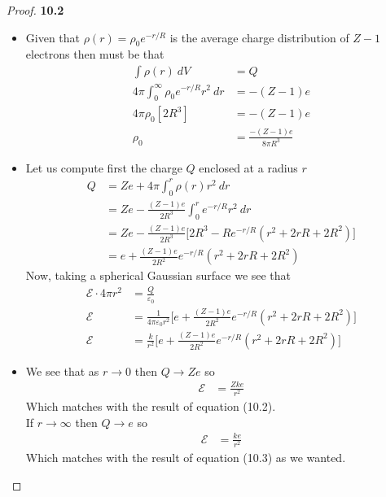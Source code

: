 \documentclass[11pt]{article}
\theoremstyle{definition}
\begin{document}
\cleardoublepage
\begin{proof}{\textbf{10.2}}
\begin{itemize}
\item [\textbf{(a)}] Given that $\rho(r) = \rho_0e^{-r/R}$ is the average
charge distribution of $Z-1$ electrons then must be that
\begin{align*}
    \int \rho(r)~dV &= Q\\
    4\pi\int_0^\infty \rho_0 e^{-r/R} r^2~ dr &= -(Z-1)e\\
    4\pi\rho_0 [2R^3] &= -(Z-1)e\\
    \rho_0 &= \frac{-(Z - 1)e}{8\pi R^3}
\end{align*}
\item [\textbf{(b)}] Let us compute first the charge $Q$ enclosed at a radius
$r$
\begin{align*}
    Q &= Ze + 4\pi\int_0^r \rho(r)r^2~dr\\
    &= Ze - \frac{(Z-1)e}{2 R^3}\int_0^r e^{-r/R}r^2~dr\\
    &= Ze - \frac{(Z-1)e}{2 R^3}\bigg[2R^3 - Re^{-r/R}(r^2 + 2rR + 2R^2)\bigg]\\
    &= e + \frac{(Z-1)e}{2 R^2}e^{-r/R}(r^2 + 2rR + 2R^2)
\end{align*}
Now, taking a spherical Gaussian surface we see that
\begin{align*}
    \mathscr{E} \cdot 4\pi r^2 &= \frac{Q}{\varepsilon_0}\\
    \mathscr{E} &= \frac{1}{4\pi\varepsilon_0 r^2}
    \bigg[e + \frac{(Z-1)e}{2 R^2}e^{-r/R}(r^2 + 2rR + 2R^2)\bigg]\\
    \mathscr{E} &= \frac{k}{r^2}
    \bigg[e + \frac{(Z-1)e}{2 R^2}e^{-r/R}(r^2 + 2rR + 2R^2)\bigg]
\end{align*}
\item [\textbf{(c)}] We see that as $r \to 0$ then $Q \to Ze$ so 
\begin{align*}
    \mathscr{E} &= \frac{Zke}{r^2}
\end{align*}
Which matches with the result of equation (10.2).\\
If $r \to \infty$ then $Q \to e$ so
\begin{align*}
    \mathscr{E} &= \frac{ke}{r^2}
\end{align*}
Which matches with the result of equation (10.3) as we wanted.
\end{itemize}
\end{proof}
\end{document}
